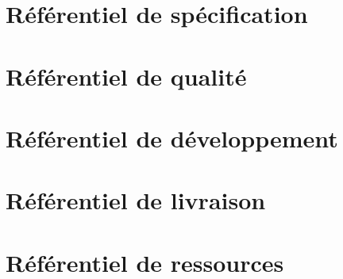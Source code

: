  \section{Référentiel de spécification}
 
 
  \section{Référentiel de qualité}
 
 
  \section{Référentiel de développement}
 
 
  \section{Référentiel de livraison}
 
 
  \section{Référentiel de ressources}
 
